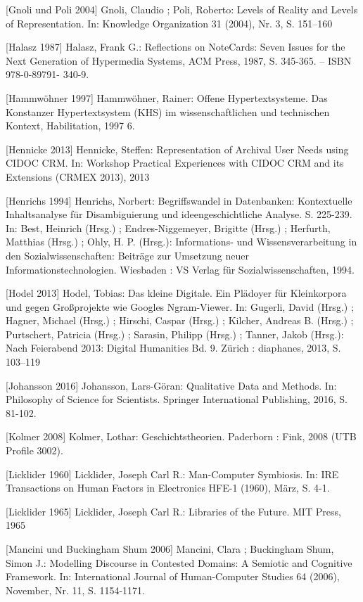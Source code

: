 \documentclass[a4paper,
fontsize=11pt,
oneside,
numbers=noperiodatend,
parskip=half-,
bibliography=totoc,
final
]{scrartcl}
\begin{document}
{[}Gnoli und Poli 2004{]} Gnoli, Claudio ; Poli, Roberto: Levels of
Reality and Levels of Representation. In: Knowledge Organization 31
(2004), Nr. 3, S. 151--160

{[}Halasz 1987{]} Halasz, Frank G.: Reflections on NoteCards: Seven
Issues for the Next Generation of Hypermedia Systems, ACM Press, 1987,
S. 345-365. -- ISBN 978-0-89791- 340-9.

{[}Hammwöhner 1997{]} Hammwöhner, Rainer: Offene Hypertextsysteme. Das
Konstanzer Hypertextsystem (KHS) im wissenschaftlichen und technischen
Kontext, Habilitation, 1997 6.

{[}Hennicke 2013{]} Hennicke, Steffen: Representation of Archival User
Needs using CIDOC CRM. In: Workshop Practical Experiences with CIDOC CRM
and its Extensions (CRMEX 2013), 2013

{[}Henrichs 1994{]} Henrichs, Norbert: Begriffswandel in Datenbanken:
Kontextuelle Inhaltsanalyse für Disambiguierung und ideengeschichtliche
Analyse. S. 225-239. In: Best, Heinrich (Hrsg.) ; Endres-Niggemeyer,
Brigitte (Hrsg.) ; Herfurth, Matthias (Hrsg.) ; Ohly, H. P. (Hrsg.):
Informations- und Wissensverarbeitung in den Sozialwissenschaften:
Beiträge zur Umsetzung neuer Informationstechnologien. Wiesbaden : VS
Verlag für Sozialwissenschaften, 1994.

{[}Hodel 2013{]} Hodel, Tobias: Das kleine Digitale. Ein Plädoyer für
Kleinkorpora und gegen Großprojekte wie Googles Ngram-Viewer. In:
Gugerli, David (Hrsg.) ; Hagner, Michael (Hrsg.) ; Hirschi, Caspar
(Hrsg.) ; Kilcher, Andreas B. (Hrsg.) ; Purtschert, Patricia (Hrsg.) ;
Sarasin, Philipp (Hrsg.) ; Tanner, Jakob (Hrsg.): Nach Feierabend 2013:
Digital Humanities Bd. 9. Zürich : diaphanes, 2013, S. 103--119

{[}Johansson 2016{]} Johansson, Lars-Göran: Qualitative Data and
Methods. In: Philosophy of Science for Scientists. Springer
International Publishing, 2016, S. 81-102.

{[}Kolmer 2008{]} Kolmer, Lothar: Geschichtstheorien. Paderborn : Fink,
2008 (UTB Profile 3002).

{[}Licklider 1960{]} Licklider, Joseph Carl R.: Man-Computer Symbiosis.
In: IRE Transactions on Human Factors in Electronics HFE-1 (1960), März,
S. 4-1.

{[}Licklider 1965{]} Licklider, Joseph Carl R.: Libraries of the Future.
MIT Press, 1965

{[}Mancini und Buckingham Shum 2006{]} Mancini, Clara ; Buckingham Shum,
Simon J.: Modelling Discourse in Contested Domains: A Semiotic and
Cognitive Framework. In: International Journal of Human-Computer Studies
64 (2006), November, Nr. 11, S. 1154-1171.
\end{document}
